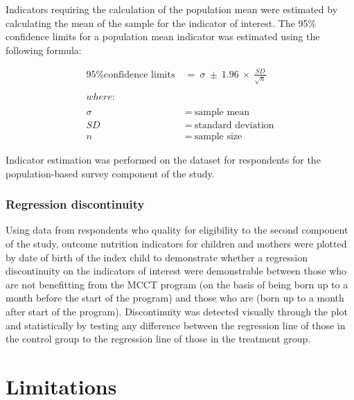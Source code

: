\documentclass[12pt,a4paper]{article}
\begin{document}
Indicators requiring the calculation of the population mean were estimated by calculating the mean of the sample for the indicator of interest. The 95\% confidence limits for a population mean indicator was estimated using the following formula:

\[
\begin{aligned}
\text{95\% confidence limits} & ~ = ~ \sigma ~ \pm ~ 1.96 ~ \times ~ \frac{SD}{\sqrt{n}} \\
\\
where: & \\
\\
\sigma & ~ = ~ \text{sample mean} \\
SD & ~ = ~ \text{standard deviation} \\
n & ~ = ~ \text{sample size}
\end{aligned}
\]

Indicator estimation was performed on the dataset for respondents for the population-based survey component of the study.

\hypertarget{regression-discontinuity}{%
\subsubsection{Regression discontinuity}\label{regression-discontinuity}}

Using data from respondents who quality for eligibility to the second component of the study, outcome nutrition indicators for children and mothers were plotted by date of birth of the index child to demonstrate whether a regression discontinuity on the indicators of interest were demonstrable between those who are not benefitting from the MCCT program (on the basis of being born up to a month before the start of the program) and those who are (born up to a month after start of the program). Discontinuity was detected visually through the plot and statistically by testing any difference between the regression line of those in the control group to the regression line of those in the treatment group.

\hypertarget{limitations}{%
\section{Limitations}\label{limitations}}
\end{document}
